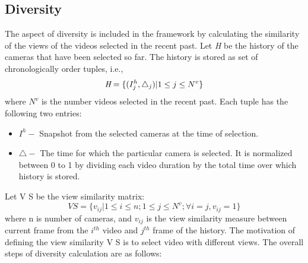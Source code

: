 \documentclass{new}
\begin{document}
\subsection{ Diversity}
The aspect of diversity is included in the framework by calculating
the similarity of the views of the videos selected in the recent
past. Let \emph{H} be the history of the cameras that have been selected so far. The history is stored as set of chronologically order tuples, i.e.,
\begin{equation}
   \emph{H} = \{(I_j^h,\triangle_j)|1 \leq j \leq N^v\}
\end{equation}
where $N^v$ is the number videos selected in the recent past. Each
tuple has the following two entries:
\begin{itemize}
    \item $I^h - $ Snapshot from the selected cameras at the time of selection.
    \item $\triangle - $ The time for which the particular camera is selected. It is normalized between 0 to 1 by dividing each video duration by the total time over which history is stored.
\end{itemize}
Let V S be the view similarity matrix:
\begin{equation}
    V S = \{v_{ij}|1 \leq i \leq n;1 \leq j \leq N^v;\forall i = j,v_{ij} = 1\} 
\end{equation}
where n is number of cameras, and $v_{ij}$ is the view similarity
measure between current frame from the $i^{th}$ video and $j^{th}$ frame of the history. The motivation of defining the view similarity V S is to select video with different views. The overall steps of diversity calculation are as follows:
\end{document}
